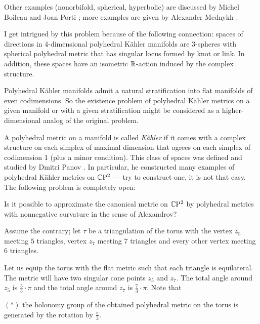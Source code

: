 Other examples (nonorbifold, spherical, hyperbolic) are discussed by Michel Boileau and Joan Porti \cite[Chapter 9]{boileau-porti};
more examples are given by Alexander Mednykh \cite{mednykh}.

I get intrigued by this problem because of the following connection:
spaces of directions in 4-dimensional polyhedral Kähler manifolds
are 3-spheres with spherical polyhedral metric that has singular locus formed by knot or link.
In addition, these spaces have an isometric $\mathbb{R}$-action induced by the complex structure.

Polyhedral Kähler manifolds admit a natural stratification into flat manifolds of even codimensions.
So the existence problem of polyhedral Kähler metrics on a given manifold or with a given stratification might be considered as a higher-dimensional analog of the original problem.

A polyhedral metric on a manifold is called \emph{Kähler} if it comes with a complex structure on each simplex of maximal dimension that agrees on each simplex of codimension 1 (plus a minor condition).
This class of spaces was defined and studied by Dmitri Panov \cite{panov-Kaeler}.
In particular, he constructed many examples of polyhedral Kähler metrics on 
$\mathbb{C}\mathrm{P}^2$ ---
try to construct one, it is not that easy.
The following problem is completely open:

\begin{pr}
Is it possible to approximate the canonical metric on $\mathbb{C}\mathrm{P}^2$ by polyhedral metrics with nonnegative curvature in the sense of Alexandrov?
\end{pr}

Assume the contrary;
let $\tau$ be a triangulation of the torus with the vertex $z_5$ meeting $5$ triangles,
vertex $z_7$ meeting $7$ triangles 
and every other vertex meeting $6$ triangles.

Let us equip the torus with the flat metric such that each triangle is equilateral.
The metric will have two singular cone points $z_5$ and $z_7$.
The total angle around $z_5$ is $\tfrac53\cdot\pi$
and the total angle around $z_7$ is $\tfrac73\cdot\pi$.
Note that

\begin{cl}{$({*})$}
the holonomy group of the obtained polyhedral metric on the torus is generated by the rotation by $\tfrac\pi3$.
\end{cl}

